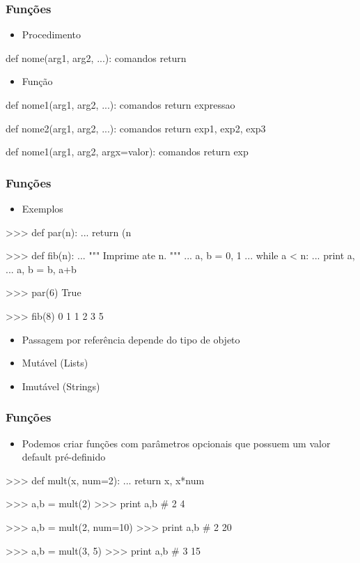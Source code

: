 \documentclass[12pt,t,graphics]{beamer}
\newcommand{\ft}[1]{\frametitle{#1}}
\newcommand{\bi}{\begin{itemize}}
\newcommand{\ei}{\end{itemize}}
\begin{document}

\begin{frame}[fragile]
  \ft{Funções}
  \bi
\item Procedimento
  \ei
  \begin{python}
def nome(arg1, arg2, ...):
    comandos
    return
  \end{python}	
  \bi
\item Função
  \ei
  \begin{python}
def nome1(arg1, arg2, ...):
    comandos
    return expressao
    
def nome2(arg1, arg2, ...):
    comandos
    return exp1, exp2, exp3

def nome1(arg1, arg2, argx=valor):
    comandos
    return exp
  \end{python}
\end{frame}


\begin{frame}[fragile]
  \ft{Funções}
  \bi
\item Exemplos
  \ei
  \begin{python}
>>> def par(n):
...     return (n %

>>> def fib(n):
...     """ Imprime ate n. """
...     a, b = 0, 1
...     while a < n:
...         print a,
 ...         a, b = b, a+b

>>> par(6) 
True

>>> fib(8) 
0 1 1 2 3 5
  \end{python}	
	\bi
	\item Passagem por referência depende do tipo de objeto
	\item Mutável (Lists)
	\item Imutável (Strings)	
	\ei
\end{frame}


\begin{frame}[fragile]
  \ft{Funções}
  \bi
\item Podemos criar funções com parâmetros opcionais
  que possuem um valor default pré-definido
  \ei
  \begin{python}
>>> def mult(x, num=2):
...     return x, x*num

>>> a,b = mult(2)
>>> print a,b # 2 4

>>> a,b = mult(2, num=10)
>>> print a,b # 2 20

>>> a,b = mult(3, 5)
>>> print a,b # 3 15
  \end{python}
\end{frame}
\end{document}
